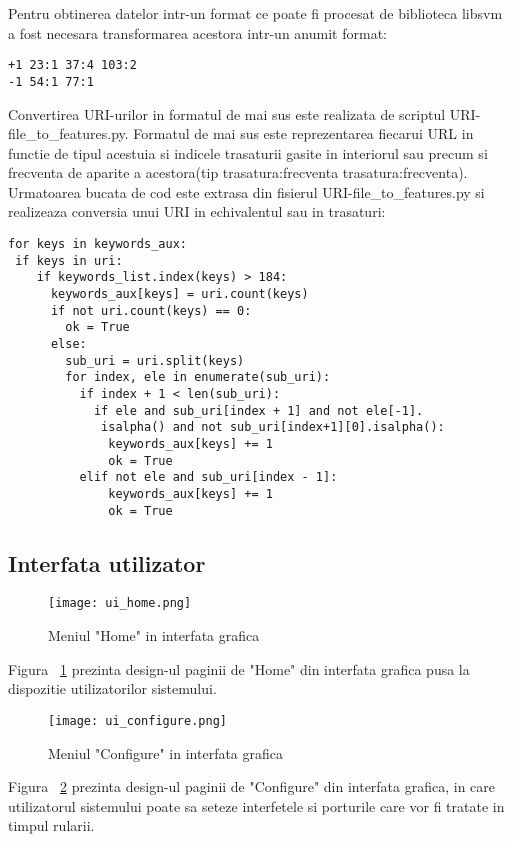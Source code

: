 Pentru obtinerea datelor intr-un format ce poate fi procesat de biblioteca libsvm \cite{libsvm} a fost necesara transformarea acestora intr-un anumit format:
\begin{lstlisting}
+1 23:1 37:4 103:2
-1 54:1 77:1
\end{lstlisting}
Convertirea URI-urilor in formatul de mai sus este realizata de scriptul URI-file\_to\_features.py. Formatul de mai sus este reprezentarea fiecarui URL in functie de tipul acestuia si indicele trasaturii gasite in interiorul sau precum si frecventa de aparite a acestora(tip trasatura:frecventa trasatura:frecventa). Urmatoarea bucata de cod este extrasa din fisierul URI-file\_to\_features.py si realizeaza conversia unui URI in echivalentul sau in trasaturi:
\begin{lstlisting}
for keys in keywords_aux:
 if keys in uri:
    if keywords_list.index(keys) > 184:
      keywords_aux[keys] = uri.count(keys)
      if not uri.count(keys) == 0:
        ok = True
      else:
        sub_uri = uri.split(keys)
        for index, ele in enumerate(sub_uri):
          if index + 1 < len(sub_uri):
            if ele and sub_uri[index + 1] and not ele[-1].
             isalpha() and not sub_uri[index+1][0].isalpha():
              keywords_aux[keys] += 1
              ok = True
          elif not ele and sub_uri[index - 1]:
              keywords_aux[keys] += 1
              ok = True
\end{lstlisting}

\subsection{Interfata utilizator}
\begin{figure}[h]
	\centering
	\texttt{[image: ui\_home.png]}
	\caption{Meniul "Home" in interfata grafica}
	\label{fig:ui_home}
\end{figure}
Figura ~\ref{fig:ui_home} prezinta design-ul paginii de "Home" din interfata grafica pusa la dispozitie utilizatorilor sistemului. \\

\begin{figure}[h]
	\centering
	\texttt{[image: ui\_configure.png]}
	\caption{Meniul "Configure" in interfata grafica}
	\label{fig:ui_configure}
\end{figure}
Figura ~\ref{fig:ui_configure} prezinta design-ul paginii de "Configure" din interfata grafica, in care utilizatorul sistemului poate sa seteze interfetele si porturile care vor fi tratate in timpul rularii. \\

